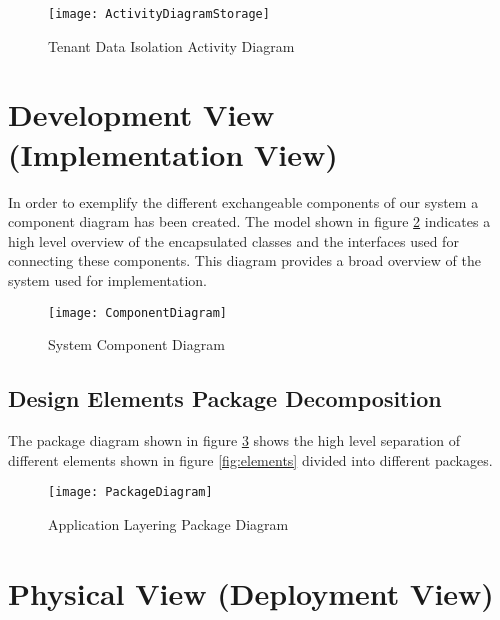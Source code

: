 \begin{figure}
\centering
\texttt{[image: ActivityDiagramStorage]}
\caption{Tenant Data Isolation Activity Diagram}
\label{fig:activitytenantisolation}
\end{figure}



\section {Development View (Implementation View)}
In order to exemplify the different exchangeable components of our system a component diagram has been created. The model shown in figure \ref{fig:componentdiagram} indicates a high level overview of the encapsulated classes and the interfaces used for connecting these components. This diagram provides a broad overview of the system used for implementation. 
\begin{figure}
\centering
\texttt{[image: ComponentDiagram]}
\caption{System Component Diagram}
\label{fig:componentdiagram}
\end{figure}

\subsection{Design Elements Package Decomposition}
The package diagram shown in figure \ref{fig:packagediagram} shows the high level separation of different elements shown in figure \ref{fig:elements} divided into different packages. 
\begin{figure}
\centering
\texttt{[image: PackageDiagram]}
\caption{Application Layering Package Diagram}
\label{fig:packagediagram}
\end{figure}


\section{Physical View (Deployment View)}
